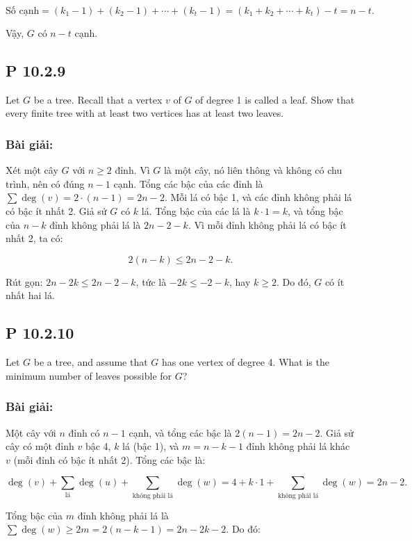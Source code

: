 \documentclass[a4paper,12pt]{article}
\begin{document}
\[
\text{Số cạnh} = (k_1 - 1) + (k_2 - 1) + \cdots + (k_t - 1) = (k_1 + k_2 + \cdots + k_t) - t = n - t.
\]

Vậy, \( G \) có \( n - t \) cạnh.

\subsection*{P 10.2.9}
Let \( G \) be a tree. Recall that a vertex \( v \) of \( G \) of degree 1 is called a leaf. Show that every finite tree with at least two vertices has at least two leaves.

\subsubsection*{Bài giải:}
Xét một cây \( G \) với \( n \geq 2 \) đỉnh. Vì \( G \) là một cây, nó liên thông và không có chu trình, nên có đúng \( n - 1 \) cạnh. Tổng các bậc của các đỉnh là \( \sum \deg(v) = 2 \cdot (n - 1) = 2n - 2 \). Mỗi lá có bậc 1, và các đỉnh không phải lá có bậc ít nhất 2. Giả sử \( G \) có \( k \) lá. Tổng bậc của các lá là \( k \cdot 1 = k \), và tổng bậc của \( n - k \) đỉnh không phải lá là \( 2n - 2 - k \). Vì mỗi đỉnh không phải lá có bậc ít nhất 2, ta có:

\[
2(n - k) \leq 2n - 2 - k.
\]

Rút gọn: \( 2n - 2k \leq 2n - 2 - k \), tức là \( -2k \leq -2 - k \), hay \( k \geq 2 \). Do đó, \( G \) có ít nhất hai lá.

\subsection*{P 10.2.10}
Let \( G \) be a tree, and assume that \( G \) has one vertex of degree 4. What is the minimum number of leaves possible for \( G \)?

\subsubsection*{Bài giải:}
Một cây với \( n \) đỉnh có \( n - 1 \) cạnh, và tổng các bậc là \( 2(n - 1) = 2n - 2 \). Giả sử cây có một đỉnh \( v \) bậc 4, \( k \) lá (bậc 1), và \( m = n - k - 1 \) đỉnh không phải lá khác \( v \) (mỗi đỉnh có bậc ít nhất 2). Tổng các bậc là:

\[
\deg(v) + \sum_{\text{lá}} \deg(u) + \sum_{\text{không phải lá}} \deg(w) = 4 + k \cdot 1 + \sum_{\text{không phải lá}} \deg(w) = 2n - 2.
\]

Tổng bậc của \( m \) đỉnh không phải lá là \( \sum \deg(w) \geq 2m = 2(n - k - 1) = 2n - 2k - 2 \). Do đó:
\end{document}

